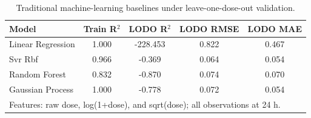 \begin{table}[htbp]
\centering
\caption{Traditional machine-learning baselines under leave-one-dose-out validation.}
\label{tab:traditional_ml_baselines}
\begin{tabular}{lcccc}
\hline
\textbf{Model} & \textbf{Train R$^2$} & \textbf{LODO R$^2$} & \textbf{LODO RMSE} & \textbf{LODO MAE} \\
\hline
Linear Regression & 1.000 & -228.453 & 0.822 & 0.467 \\
Svr Rbf & 0.966 & -0.369 & 0.064 & 0.054 \\
Random Forest & 0.832 & -0.870 & 0.074 & 0.070 \\
Gaussian Process & 1.000 & -0.778 & 0.072 & 0.054 \\
\hline
\multicolumn{5}{l}{\small Features: raw dose, log(1+dose), and sqrt(dose); all observations at 24 h.} \\
\end{tabular}
\end{table}
